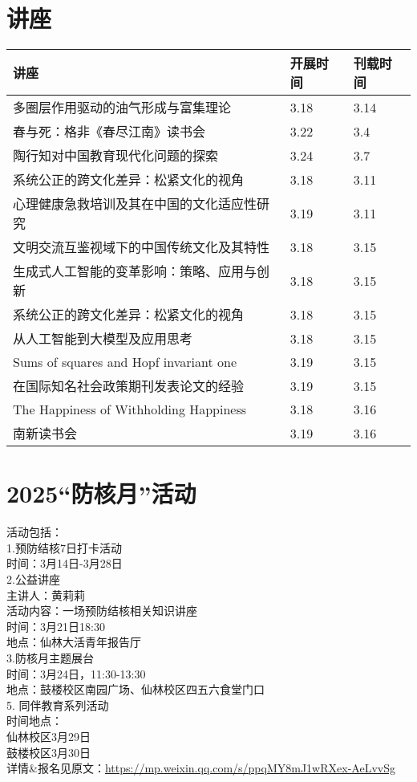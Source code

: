\documentclass[letterpaper, 12pt]{article}
\begin{document}
\begin{multicols}{2}
\pagebreak

\section{讲座}
\begin{tabular}{|>{\centering\arraybackslash}m{}|m{}|m{}|}
    \hline
    讲座 & 开展时间 & 刊载时间\\
    \hline\hline
    多圈层作用驱动的油气形成与富集理论 & 3.18 & 3.14\\\hline
    春与死：格非《春尽江南》读书会 & 3.22 & 3.4\\\hline
    陶行知对中国教育现代化问题的探索 & 3.24 & 3.7\\\hline
    系统公正的跨文化差异：松紧文化的视角 & 3.18 & 3.11\\\hline
    心理健康急救培训及其在中国的文化适应性研究 & 3.19 & 3.11\\\hline
    文明交流互鉴视域下的中国传统文化及其特性 & 3.18 & 3.15\\\hline
    生成式人工智能的变革影响：策略、应用与创新 & 3.18 & 3.15\\\hline
    系统公正的跨文化差异：松紧文化的视角 & 3.18 & 3.15\\\hline
    从人工智能到大模型及应用思考 & 3.18 & 3.15\\\hline
    Sums of squares and Hopf invariant one & 3.19 & 3.15\\\hline
    在国际知名社会政策期刊发表论文的经验 & 3.19 & 3.15\\\hline
    The Happiness of Withholding Happiness & 3.18 & 3.16\\\hline
    南新读书会 & 3.19 & 3.16\\\hline
\end{tabular}

\section{2025“防核月”活动}
活动包括：\\
1.预防结核7日打卡活动\\
时间：3月14日-3月28日\\
2.公益讲座\\
主讲人：黄莉莉\\
活动内容：一场预防结核相关知识讲座\\
时间：3月21日18:30\\
地点：仙林大活青年报告厅\\
3.防核月主题展台\\
时间：3月24日，11:30-13:30\\
地点：鼓楼校区南园广场、仙林校区四五六食堂门口\\
5. 同伴教育系列活动\\
时间地点：\\
仙林校区3月29日\\
鼓楼校区3月30日\\
详情\&报名见原文：\url{https://mp.weixin.qq.com/s/ppqMY8mJ1wRXex-AeLvvSg}


\end{multicols}
\end{document}
